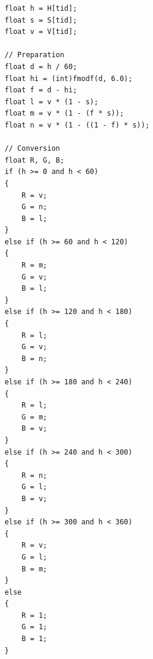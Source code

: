 \documentclass{article}
\begin{document}
\begin{itemize}
\begin{verbatim}
    float h = H[tid];
    float s = S[tid];
    float v = V[tid];

    // Preparation
    float d = h / 60;
    float hi = (int)fmodf(d, 6.0);
    float f = d - hi;
    float l = v * (1 - s);
    float m = v * (1 - (f * s));
    float n = v * (1 - ((1 - f) * s));

    // Conversion
    float R, G, B;
    if (h >= 0 and h < 60)
    {
        R = v;
        G = n;
        B = l;
    }
    else if (h >= 60 and h < 120)
    {
        R = m;
        G = v;
        B = l;
    }
    else if (h >= 120 and h < 180)
    {
        R = l;
        G = v;
        B = n;
    }
    else if (h >= 180 and h < 240)
    {
        R = l;
        G = m;
        B = v;
    }
    else if (h >= 240 and h < 300)
    {
        R = n;
        G = l;
        B = v;
    }
    else if (h >= 300 and h < 360)
    {
        R = v;
        G = l;
        B = m;
    }
    else
    {
        R = 1;
        G = 1;
        B = 1;
    }


\end{verbatim}
\end{itemize}
\end{document}
